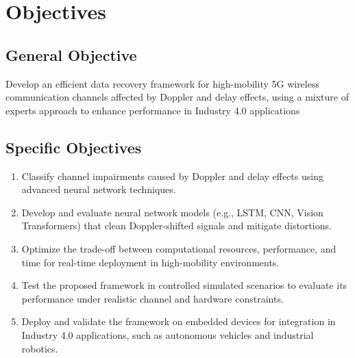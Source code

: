 \section{Objectives}
\subsection{General Objective}

Develop an efficient data recovery framework for high-mobility 5G wireless communication channels affected by Doppler and delay effects, using a mixture of experts approach to enhance performance in Industry 4.0 applications

\subsection{Specific Objectives}

\begin{enumerate}
    \item Classify channel impairments caused by Doppler and delay effects using advanced neural network techniques.
    \item Develop and evaluate neural network models (e.g., LSTM, CNN, Vision Transformers) that clean Doppler-shifted signals and mitigate distortions.
    \item Optimize the trade-off between computational resources, performance, and time for real-time deployment in high-mobility environments.
    \item Test the proposed framework in controlled simulated scenarios to evaluate its performance under realistic channel and hardware constraints.
    \item Deploy and validate the framework on embedded devices for integration in Industry 4.0 applications, such as autonomous vehicles and industrial robotics.
\end{enumerate}